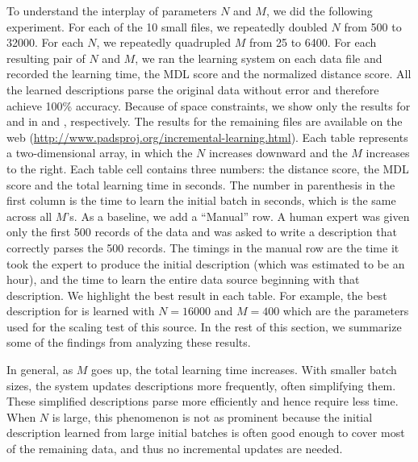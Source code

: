 To understand the interplay of parameters $N$ and $M$,
we did the following experiment. For each of the 10 small files,
we repeatedly doubled $N$ from 500 to 32000. 
For each $N$, we repeatedly quadrupled $M$ from 25 to 6400.  
For each resulting pair of $N$ and $M$, we ran the learning system on each data file and
recorded the learning time, the MDL score
and the normalized distance score. 
All the learned descriptions parse the original data
without error and therefore achieve 100\% accuracy. 
Because of space constraints, we show only
the results for  and  in
 and , respectively.
The results for the remaining files are available on the web (\url{http://www.padsproj.org/incremental-learning.html}).
Each table represents a two-dimensional array, in which the $N$
increases downward and the $M$ increases to the right.
Each table cell contains three numbers: the distance score, the MDL score
and the total learning time in seconds. The number in parenthesis in the first column
is the time to learn the initial batch in seconds, which is the same across all
$M$'s. As a baseline, we add a ``Manual'' row. 
A human expert was given
only the first 500 records of the data and was asked to write a \pads{}
description that correctly parses the 500 records. The timings in the manual
row are the time it took the expert to produce the initial description 
(which was estimated to be an hour), and the
time to learn the entire data source beginning with that description. 
We highlight the best result in each table. For example, the best description
for  is learned with $N=16000$ and $M=400$ which are the
parameters used for the scaling test of this source. 
In the rest of this section, we summarize some of the findings 
from analyzing these results.


In general, as $M$ goes up, the total learning time increases. 
With smaller batch sizes, the system updates descriptions 
more frequently, often simplifying them. These simplified descriptions 
parse more efficiently and
hence require less time. When $N$ is large, this phenomenon is not as prominent 
because the initial description learned from large
initial batches is often good enough to cover most of the remaining data,
and thus no incremental updates are needed.

